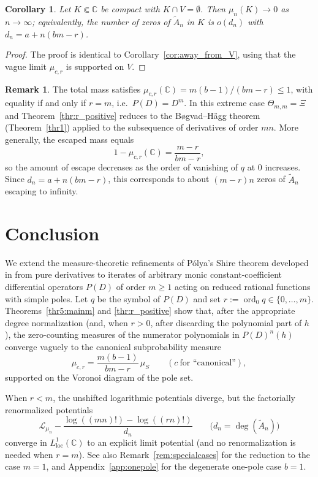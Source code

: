 \documentclass[12pt]{article}
\theoremstyle{plain}
\newtheorem{corollary}[theorem]{Corollary}
\theoremstyle{definition}
\newtheorem{remark}[theorem]{Remark}
\begin{document}
\begin{corollary}\label{cor:away_from_V_r}
Let $K\Subset\mathbb C$ be compact with $K\cap V=\emptyset$.
Then $\mu_n(K)\to0$ as $n\to\infty$; equivalently, the number of zeros of $\widetilde A_n$ in $K$ is $o(d_n)$ with $d_n=a+n(bm-r)$.
\end{corollary}

\begin{proof}
The proof is identical to Corollary~\ref{cor:away_from_V}, using that the vague limit $\mu_{c,r}$ is supported on $V$.
\end{proof}

\begin{remark}\label{rem:c0}
The total mass satisfies $\mu_{c,r}(\mathbb C)=m(b-1)/(bm-r)\le1$, with equality if and only if $r=m$, i.e.\ $P(D)=D^m$.
In this extreme case $\Theta_{m,m}=\Xi$ and Theorem~\ref{thr:r_positive} reduces to the B\o gvad--H\"agg theorem (Theorem~\ref{thr1}) applied to the subsequence of derivatives of order $mn$.
More generally, the escaped mass equals
$$1-\mu_{c,r}(\mathbb C)=\frac{m-r}{bm-r},$$
so the amount of escape decreases as the order of vanishing of $q$ at $0$ increases.
Since $d_n=a+n(bm-r)$, this corresponds to about $(m-r)n$ zeros of $\widetilde A_n$ escaping to infinity.
\end{remark}

\section{Conclusion}\label{sec6}

We extend the measure-theoretic refinements of P\'olya's Shire theorem developed in \cite{B:H,Hagg} from pure derivatives to iterates of arbitrary monic constant-coefficient differential operators $P(D)$ of order $m\ge1$ acting on reduced rational functions with simple poles.
Let $q$ be the symbol of $P(D)$ and set $r:=\operatorname{ord}_0 q\in\{0,\dots,m\}$.
Theorems~\ref{thr5:mainm} and \ref{thr:r_positive} show that, after the appropriate degree normalization (and, when $r>0$, after discarding the polynomial part of $h$), the zero-counting measures of the numerator polynomials in $P(D)^n(h)$ converge vaguely to the canonical subprobability measure
$$\mu_{c,r}=\frac{m(b-1)}{bm-r}\,\mu_S \qquad (c\ \text{for ``canonical''}),$$
supported on the Voronoi diagram of the pole set.

When $r<m$, the unshifted logarithmic potentials diverge, but the factorially renormalized potentials
$$\mathcal L_{\mu_n}-\frac{\log((mn)!)-\log((rn)!)}{d_n}\qquad\bigl(d_n=\deg(\widetilde A_n)\bigr)$$
converge in $L^1_{\mathrm{loc}}(\mathbb C)$ to an explicit limit potential (and no renormalization is needed when $r=m$).
See also Remark~\ref{rem:specialcases} for the reduction to the case $m=1$, and Appendix~\ref{app:onepole} for the degenerate one-pole case $b=1$.
\end{document}
